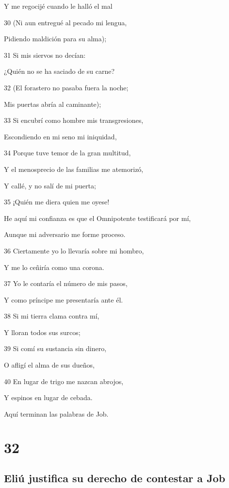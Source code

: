 \par Y me regocijé cuando le halló el mal
\par 30 (Ni aun entregué al pecado mi lengua,
\par Pidiendo maldición para su alma);
\par 31 Si mis siervos no decían:
\par ¿Quién no se ha saciado de su carne?
\par 32 (El forastero no pasaba fuera la noche;
\par Mis puertas abría al caminante);
\par 33 Si encubrí como hombre mis transgresiones,
\par Escondiendo en mi seno mi iniquidad,
\par 34 Porque tuve temor de la gran multitud,
\par Y el menosprecio de las familias me atemorizó,
\par Y callé, y no salí de mi puerta;
\par 35 ¡Quién me diera quien me oyese!
\par He aquí mi confianza es que el Omnipotente testificará por mí,
\par Aunque mi adversario me forme proceso.
\par 36 Ciertamente yo lo llevaría sobre mi hombro,
\par Y me lo ceñiría como una corona.
\par 37 Yo le contaría el número de mis pasos,
\par Y como príncipe me presentaría ante él.
\par 38 Si mi tierra clama contra mí,
\par Y lloran todos sus surcos;
\par 39 Si comí su sustancia sin dinero,
\par O afligí el alma de sus dueños,
\par 40 En lugar de trigo me nazcan abrojos,
\par Y espinos en lugar de cebada.
\par Aquí terminan las palabras de Job.

\chapter{32}

\section*{Eliú justifica su derecho de contestar a Job}


